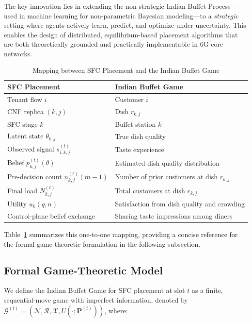 \documentclass[journal]{IEEEtran}
\theoremstyle{plain}
\theoremstyle{definition}
\theoremstyle{remark}
\begin{document}
The key innovation lies in extending the non-strategic Indian Buffet Process—used in machine learning for non-parametric Bayesian modeling—to a \emph{strategic} setting where agents actively learn, predict, and optimize under uncertainty. This enables the design of distributed, equilibrium-based placement algorithms that are both theoretically grounded and practically implementable in 6G core networks.

\begin{table}[!t]
\centering
\caption{Mapping between SFC Placement and the Indian Buffet Game}
\label{tab:ibg_mapping}
\begin{tabular}{ll}
\toprule
\textbf{SFC Placement} & \textbf{Indian Buffet Game} \\
\midrule
Tenant flow $i$ & Customer $i$ \\
CNF replica $(k,j)$ & Dish $r_{k,j}$ \\
SFC stage $k$ & Buffet station $k$ \\
Latent state $\theta_{k,j}$ & True dish quality \\
Observed signal $s_{i,k,j}^{(t)}$ & Taste experience \\
Belief $p_{k,j}^{(t)}(\theta)$ & Estimated dish quality distribution \\
Pre-decision count $n_{k,j}^{(t)}(m-1)$ & Number of prior customers at dish $r_{k,j}$ \\
Final load $N_{k,j}^{(t)}$ & Total customers at dish $r_{k,j}$ \\
Utility $u_k(q,n)$ & Satisfaction from dish quality and crowding \\
Control-plane belief exchange & Sharing taste impressions among diners \\
\bottomrule
\end{tabular}
\end{table}

Table~\ref{tab:ibg_mapping} summarizes this one-to-one mapping, providing a concise reference for the formal game-theoretic formulation in the following subsection.


\subsection{Formal Game-Theoretic Model}
\label{sec:ibg_formal_model}

We define the Indian Buffet Game for SFC placement at slot $t$ as a finite, sequential-move game with imperfect information, denoted by $\mathcal{G}^{(t)} = (\mathcal{N}, \mathcal{R}, \mathcal{X}, U(\cdot; \mathbf{P}^{(t)}))$, where:
\end{document}
